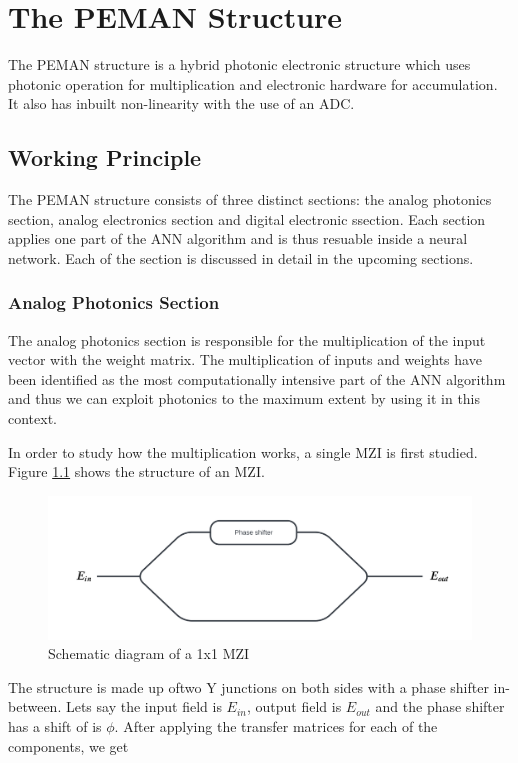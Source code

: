 \chapter{The PEMAN Structure}

The PEMAN structure is a hybrid photonic electronic structure which uses photonic operation for multiplication and electronic hardware for accumulation. It also has inbuilt non-linearity with the use of an ADC.

\section{Working Principle}

The PEMAN structure consists of three distinct sections: the analog photonics section, analog electronics section and digital electronic ssection. Each section applies one part of the ANN algorithm and is thus resuable inside a neural network. Each of the section is discussed in detail in the upcoming sections.

\subsection{Analog Photonics Section}

The analog photonics section is responsible for the multiplication of the input vector with the weight matrix. The multiplication of inputs and weights have been identified as the most computationally intensive part of the ANN algorithm and thus we can exploit photonics to the maximum extent by using it in this context.

In order to study how the multiplication works, a single MZI is first studied. Figure \ref{1x1mzi} shows the structure of an MZI.

\begin{figure}
	\centering
	\includegraphics[width=\textwidth]{images/mzi.png}
	\caption{Schematic diagram of a 1x1 MZI}
	\label{1x1mzi}
\end{figure}

The structure is made up oftwo Y junctions on both sides with a phase shifter in-between. Lets say the input field is $E_{in}$, output field is $E_{out}$ and the phase shifter has a shift of is $\phi$. After applying the transfer matrices for each of the components, we get

